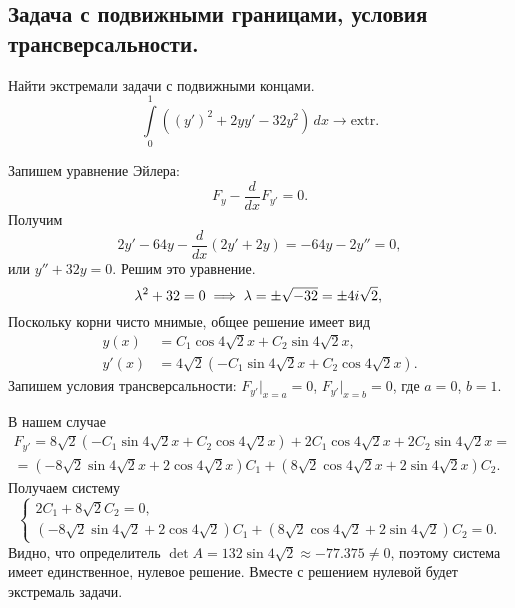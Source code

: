 \subsection{Задача с подвижными границами, условия трансверсальности.}
\begin{example}
 Найти экстремали задачи с подвижными концами.  
 \[
   \int\limits_{0}^{1} ((y')^2 + 2yy' - 32y^2)\,dx \to \mathrm{extr}.
 \]
 
\begin{solution}
  Запишем уравнение Эйлера:  
  \[
    F_y - \frac{d}{dx} F_{y'} = 0.
  \]
 Получим  
 \[
     2y' - 64y - \frac{d}{dx}(2y' + 2y) = - 64y - 2y'' = 0,
 \]
 или $ y'' + 32y = 0 $. Решим это уравнение.  
 \[
   \lambda^2 + 32 = 0 \implies \lambda = \pm\sqrt{-32} = \pm 4i\sqrt{2},\\
 \]
 Поскольку корни чисто мнимые, общее решение имеет вид  
 \begin{align*}
   y(x) &= C_1 \cos 4\sqrt{2}x + C_2 \sin 4\sqrt{2}x,\\
   y'(x) &= 4\sqrt2(-C_1\sin4\sqrt2 x + C_2\cos4\sqrt2 x).
 \end{align*}
 Запишем условия трансверсальности: $ F_{y'} \big|_{x=a} = 0 $, $ F_{y'}\big|_{x=b}=0 $,
 где $ a = 0 $, $ b = 1 $.

 В нашем случае
 \begin{multline*}
   F_{y'} = 8\sqrt{2}(-C_1\sin4\sqrt2 x + C_2 \cos4\sqrt2 x) + 2C_1\cos 4\sqrt2
   x + 2C_2 \sin4\sqrt2 x = \\ =
   (-8\sqrt2\sin4\sqrt2 x + 2\cos4\sqrt2 x)C_1 + (8\sqrt2 \cos 4\sqrt2 x +
   2\sin4\sqrt2 x) C_2.
 \end{multline*}
Получаем систему
\[
    \begin{cases}
      2C_1 + 8\sqrt2 C_2 = 0, \\
   (-8\sqrt2\sin4\sqrt2  + 2\cos4\sqrt2 )C_1 + (8\sqrt2 \cos 4\sqrt2  +
   2\sin4\sqrt2 ) C_2 = 0.
    \end{cases}
\]
Видно, что определитель $ \det A = 132 \sin4 \sqrt{2} \approx
  -77.375 \neq 0 $, поэтому система имеет единственное, нулевое решение. Вместе
  с решением нулевой будет экстремаль задачи.
\end{solution}
\end{example}

